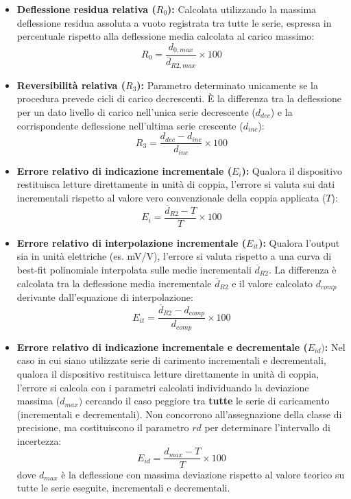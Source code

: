 \documentclass[a4paper, twoside]{article}
\begin{document}
\begin{itemize}
    \item \textbf{Deflessione residua relativa ($R_0$):} Calcolata utilizzando la massima deflessione residua assoluta a vuoto registrata tra tutte le serie, espressa in percentuale rispetto alla deflessione media calcolata al carico massimo:
    \begin{equation}
        R_0 = \frac{d_{0,max}}{\overline{d}_{R2,max}} \times 100
    \end{equation}

    \item \textbf{Reversibilità relativa ($R_3$):} Parametro determinato unicamente se la procedura prevede cicli di carico decrescenti. È la differenza tra la deflessione per un dato livello di carico nell'unica serie decrescente ($d_{dec}$) e la corrispondente deflessione nell'ultima serie crescente ($d_{inc}$):
    \begin{equation}
        R_3 = \frac{d_{dec} - d_{inc}}{d_{inc}} \times 100
    \end{equation}

    \item \textbf{Errore relativo di indicazione incrementale ($E_i$):} Qualora il dispositivo restituisca letture direttamente in unità di coppia, l'errore si valuta sui dati incrementali rispetto al valore vero convenzionale della coppia applicata ($T$):
    \begin{equation}
        E_i = \frac{\overline{d}_{R2} - T}{T} \times 100
    \end{equation}

    \item \textbf{Errore relativo di interpolazione incrementale ($E_{it}$):} Qualora l'output sia in unità elettriche (es. mV/V), l'errore si valuta rispetto a una curva di best-fit polinomiale interpolata sulle medie incrementali $\overline{d}_{R2}$. La differenza è calcolata tra la deflessione media incrementale $\overline{d}_{R2}$ e il valore calcolato $d_{comp}$ derivante dall'equazione di interpolazione:
    \begin{equation}
        E_{it} = \frac{\overline{d}_{R2} - d_{comp}}{d_{comp}} \times 100
    \end{equation}

    \item \textbf{Errore relativo di indicazione incrementale e decrementale ($E_{id})$:} Nel caso in cui siano utilizzate serie di carimento incrementali e decrementali, qualora il dispositivo restituisca letture direttamente in unità di coppia, l'errore si calcola con i parametri calcolati individuando la deviazione massima ($d_{max})$ cercando il caso peggiore tra \textbf{tutte} le serie di caricamento (incrementali e decrementali). Non concorrono all'assegnazione della classe di precisione, ma costituiscono il parametro $rd$ per determinare l'intervallo di incertezza:
    \begin{equation}
        E_{id} = \frac{d_{max} - T}{T} \times 100 
    \end{equation}
    dove $d_{max}$ è la deflessione con massima deviazione rispetto al valore teorico su tutte le serie eseguite, incrementali e decrementali.
    

\end{itemize}
\end{document}
